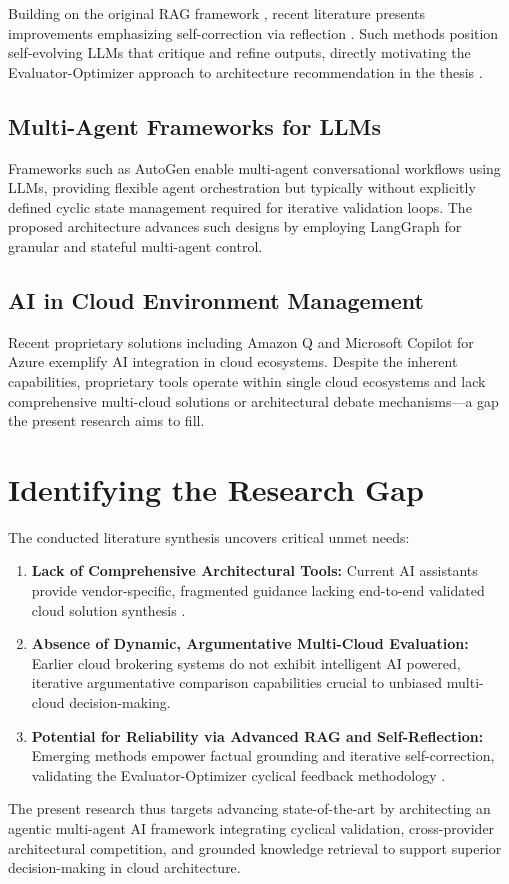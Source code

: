 Building on the original RAG framework \cite{lewis2020rag}, recent literature presents improvements emphasizing self-correction via reflection \cite{asai2023selfrag}. Such methods position self-evolving LLMs that critique and refine outputs, directly motivating the Evaluator-Optimizer approach to architecture recommendation in the thesis \cite{anthropic2024agents}.

\subsection{Multi-Agent Frameworks for LLMs}

Frameworks such as AutoGen \cite{wu2023autogen} enable multi-agent conversational workflows using LLMs, providing flexible agent orchestration but typically without explicitly defined cyclic state management required for iterative validation loops. The proposed architecture advances such designs by employing LangGraph \cite{langgraph2024docs} for granular and stateful multi-agent control.

\subsection{AI in Cloud Environment Management}

Recent proprietary solutions including Amazon Q \cite{aws2023q} and Microsoft Copilot for Azure \cite{microsoft2024copilot} exemplify AI integration in cloud ecosystems. Despite the inherent capabilities, proprietary tools operate within single cloud ecosystems and lack comprehensive multi-cloud solutions or architectural debate mechanisms—a gap the present research aims to fill.

\section{Identifying the Research Gap}

The conducted literature synthesis uncovers critical unmet needs:

\begin{enumerate}
    \item \textbf{Lack of Comprehensive Architectural Tools:} Current AI assistants provide vendor-specific, fragmented guidance lacking end-to-end validated cloud solution synthesis \cite{aws2023q, microsoft2024copilot}.
    \item \textbf{Absence of Dynamic, Argumentative Multi-Cloud Evaluation:} Earlier cloud brokering systems \cite{chauhan2014brokering} do not exhibit intelligent AI powered, iterative argumentative comparison capabilities crucial to unbiased multi-cloud decision-making.
    \item \textbf{Potential for Reliability via Advanced RAG and Self-Reflection:} Emerging methods \cite{lewis2020rag, asai2023selfrag} empower factual grounding and iterative self-correction, validating the Evaluator-Optimizer cyclical feedback methodology \cite{anthropic2024agents}.
\end{enumerate}

The present research thus targets advancing state-of-the-art by architecting an agentic multi-agent AI framework integrating cyclical validation, cross-provider architectural competition, and grounded knowledge retrieval to support superior decision-making in cloud architecture.